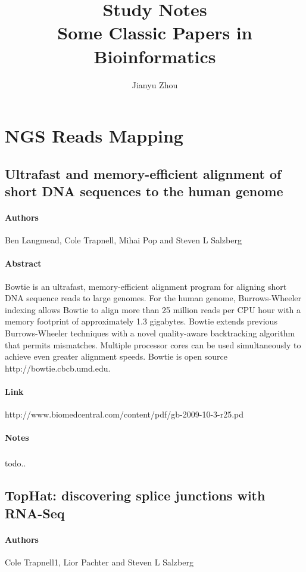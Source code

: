 \documentclass{article}
\title{\textbf{Study Notes} \\ Some Classic Papers in Bioinformatics}
\author{Jianyu Zhou}
\begin{document}
	\maketitle
	\tableofcontents
	\newpage
	\section{NGS Reads Mapping}
		\subsection{Ultrafast and memory-efficient alignment of short DNA sequences to the human genome}
			\paragraph{Authors\\} Ben Langmead, Cole Trapnell, Mihai Pop and Steven L Salzberg
			\paragraph{Abstract\\} Bowtie is an ultrafast, memory-efficient alignment program for aligning short DNA sequence reads to large genomes. For the human genome, Burrows-Wheeler indexing allows Bowtie to align more than 25 million reads per CPU hour with a memory footprint of approximately 1.3 gigabytes. Bowtie extends previous Burrows-Wheeler techniques with a novel quality-aware backtracking algorithm that permits mismatches. Multiple processor cores can be used simultaneously to achieve even greater alignment speeds. Bowtie is open source http://bowtie.cbcb.umd.edu.
			\paragraph{Link\\}  http://www.biomedcentral.com/content/pdf/gb-2009-10-3-r25.pd
			\paragraph{Notes}
				\subparagraph{} todo..
		\subsection{TopHat: discovering splice junctions with RNA-Seq}
			\paragraph{Authors\\} Cole Trapnell1, Lior Pachter and Steven L Salzberg
\end{document}
